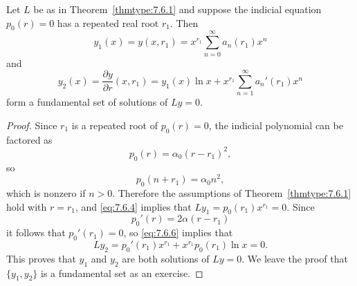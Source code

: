 \documentclass{ximera}
\begin{document}
\begin{theorem}\label{thmtype:7.6.2}
Let $L$ be as in Theorem~\ref{thmtype:7.6.1} and suppose the
indicial equation $p_0(r)=0$ has a repeated real root $r_1$.
Then
$$
y_1(x)=y(x,r_1)=x^{r_1}\sum_{n=0}^\infty a_n(r_1)x^n
$$
and
\begin{equation} \label{eq:7.6.8}
y_2(x)=\frac{\partial y}{\partial r}(x,r_1)=y_1(x)\ln
x+x^{r_1}\sum_{n=1}^\infty a_n'(r_1)x^n
\end{equation}
form a fundamental set of solutions of $Ly=0.$
\end{theorem}

\begin{proof}
Since $r_1$  is a repeated root of $p_0(r)=0$, the indicial polynomial
can be factored as
$$
p_0(r)=\alpha_0(r-r_1)^2,
$$
so
$$
p_0(n+r_1)=\alpha_0n^2,
$$
which is nonzero if $n>0$. Therefore the assumptions of
Theorem~\ref{thmtype:7.6.1} hold with $r=r_1$, and \eqref{eq:7.6.4} implies
that $Ly_1=p_0(r_1)x^{r_1}=0$. Since
$$
p_0'(r)=2\alpha(r-r_1)
$$
it follows that $p_0'(r_1)=0$, so \eqref{eq:7.6.6} implies that
$$
Ly_2=p_0'(r_1)x^{r_1}+x^{r_1}p_0(r_1)\ln x=0.
$$
This proves that $y_1$ and $y_2$ are both solutions of $Ly=0$. We
leave the proof that $\{y_1,y_2\}$ is a fundamental set as an exercise.
\end{proof}
\end{document}
